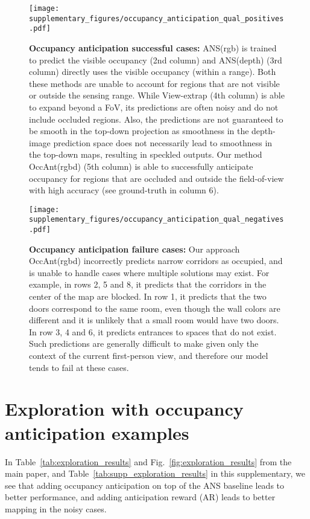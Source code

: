 \documentclass[runningheads]{llncs}
\begin{document}
\begin{figure}
    \centering
    \texttt{[image: supplementary\_figures/occupancy\_anticipation\_qual\_positives.pdf]}
    \caption{\small \textbf{Occupancy anticipation successful cases:} ANS(rgb) is trained to predict the visible occupancy (2nd column) and ANS(depth) (3rd column) directly uses the visible occupancy (within a  range). Both these methods are unable to account for regions that are not visible or outside the sensing range. While View-extrap (4th column) is able to expand beyond a  FoV, its predictions are often noisy and do not include occluded regions. Also, the predictions are not guaranteed to be smooth in the top-down projection as smoothness in the depth-image prediction space does not necessarily lead to smoothness in the top-down maps, resulting in speckled outputs. Our method OccAnt(rgbd) (5th column) is able to successfully anticipate occupancy for regions that are occluded and outside the field-of-view with high accuracy (see ground-truth in column 6).}
    \label{fig:occ_ant_positives}
\end{figure}

\begin{figure}
    \centering
    \texttt{[image: supplementary\_figures/occupancy\_anticipation\_qual\_negatives.pdf]}
    \caption{\small \textbf{Occupancy anticipation failure cases:} Our approach OccAnt(rgbd) incorrectly predicts narrow corridors as occupied, and is unable to handle cases where multiple solutions may exist. For example, in rows 2, 5 and 8, it predicts that the corridors in the center of the map are blocked. In row 1, it predicts that the two doors correspond to the same room, even though the wall colors are different and it is unlikely that a small room would have two doors. In row 3, 4 and 6, it predicts entrances to spaces that do not exist. Such predictions are generally difficult to make given only the context of the current first-person view, and therefore our model tends to fail at these cases.}
    \label{fig:occ_ant_negatives}
\end{figure}


\section{Exploration with occupancy anticipation examples}
\label{sec:supp_exploration_qualitative}
In Table~\ref{tab:exploration_results} and Fig.~\ref{fig:exploration_results} from the main paper, and Table~\ref{tab:supp_exploration_results} in this supplementary, we see that adding occupancy anticipation on top of the ANS baseline leads to better performance, and adding anticipation reward (AR) leads to better mapping in the noisy cases.
\end{document}
